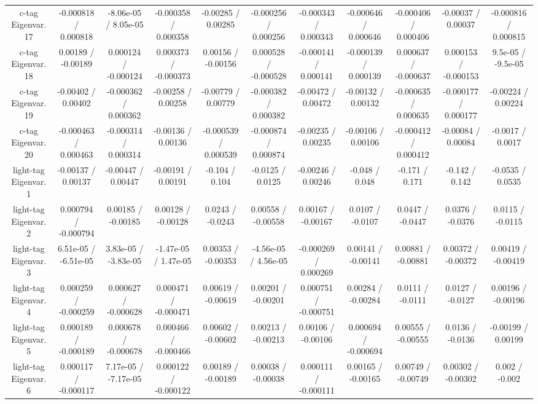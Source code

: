 {\begin{landscape}
\begin{longtable}{@{\extracolsep{\fill}}| *{11}{c|}}
  c-tag Eigenvar. 17 & -0.000818 / 0.000818 & -8.06e-05 / 8.05e-05 & -0.000358 / 0.000358 & -0.00285 / 0.00285 & -0.000256 / 0.000256 & -0.000343 / 0.000343 & -0.000646 / 0.000646 & -0.000406 / 0.000406 & -0.00037 / 0.00037 & -0.000816 / 0.000815 \\ 
  c-tag Eigenvar. 18 & 0.00189 / -0.00189 & 0.000124 / -0.000124 & 0.000373 / -0.000373 & 0.00156 / -0.00156 & 0.000528 / -0.000528 & -0.000141 / 0.000141 & -0.000139 / 0.000139 & 0.000637 / -0.000637 & 0.000153 / -0.000153 & 9.5e-05 / -9.5e-05 \\ 
  c-tag Eigenvar. 19 & -0.00402 / 0.00402 & -0.000362 / 0.000362 & -0.00258 / 0.00258 & -0.00779 / 0.00779 & -0.000382 / 0.000382 & -0.00472 / 0.00472 & -0.00132 / 0.00132 & -0.000635 / 0.000635 & -0.000177 / 0.000177 & -0.00224 / 0.00224 \\ 
  c-tag Eigenvar. 20 & -0.000463 / 0.000463 & -0.000314 / 0.000314 & -0.00136 / 0.00136 & -0.000539 / 0.000539 & -0.000874 / 0.000874 & -0.00235 / 0.00235 & -0.00106 / 0.00106 & -0.000412 / 0.000412 & -0.00084 / 0.00084 & -0.0017 / 0.0017 \\ 
  light-tag Eigenvar. 1 & -0.00137 / 0.00137 & -0.00447 / 0.00447 & -0.00191 / 0.00191 & -0.104 / 0.104 & -0.0125 / 0.0125 & -0.00246 / 0.00246 & -0.048 / 0.048 & -0.171 / 0.171 & -0.142 / 0.142 & -0.0535 / 0.0535 \\ 
  light-tag Eigenvar. 2 & 0.000794 / -0.000794 & 0.00185 / -0.00185 & 0.00128 / -0.00128 & 0.0243 / -0.0243 & 0.00558 / -0.00558 & 0.00167 / -0.00167 & 0.0107 / -0.0107 & 0.0447 / -0.0447 & 0.0376 / -0.0376 & 0.0115 / -0.0115 \\ 
  light-tag Eigenvar. 3 & 6.51e-05 / -6.51e-05 & 3.83e-05 / -3.83e-05 & -1.47e-05 / 1.47e-05 & 0.00353 / -0.00353 & -4.56e-05 / 4.56e-05 & -0.000269 / 0.000269 & 0.00141 / -0.00141 & 0.00881 / -0.00881 & 0.00372 / -0.00372 & 0.00419 / -0.00419 \\ 
  light-tag Eigenvar. 4 & 0.000259 / -0.000259 & 0.000627 / -0.000628 & 0.000471 / -0.000471 & 0.00619 / -0.00619 & 0.00201 / -0.00201 & 0.000751 / -0.000751 & 0.00284 / -0.00284 & 0.0111 / -0.0111 & 0.0127 / -0.0127 & 0.00196 / -0.00196 \\ 
  light-tag Eigenvar. 5 & 0.000189 / -0.000189 & 0.000678 / -0.000678 & 0.000466 / -0.000466 & 0.00602 / -0.00602 & 0.00213 / -0.00213 & 0.00106 / -0.00106 & 0.000694 / -0.000694 & 0.00555 / -0.00555 & 0.0136 / -0.0136 & -0.00199 / 0.00199 \\ 
  light-tag Eigenvar. 6 & 0.000117 / -0.000117 & 7.17e-05 / -7.17e-05 & 0.000122 / -0.000122 & 0.00189 / -0.00189 & 0.00038 / -0.00038 & 0.000111 / -0.000111 & 0.00165 / -0.00165 & 0.00749 / -0.00749 & 0.00302 / -0.00302 & 0.002 / -0.002 \\ 

\end{longtable}
\end{landscape}}
